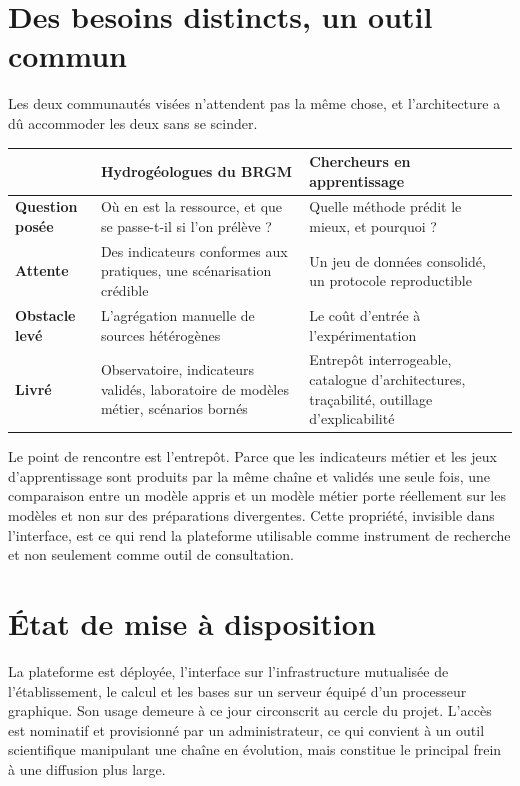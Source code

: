\section{Des besoins distincts, un outil commun}

Les deux communautés visées n'attendent pas la même chose, et l'architecture a dû accommoder les
deux sans se scinder.

\begin{center}
\begin{tabularx}{\textwidth}{@{}p{3.6cm}XX@{}}
\toprule
 & \textbf{Hydrogéologues du BRGM} & \textbf{Chercheurs en apprentissage} \\
\midrule
\textbf{Question posée} & Où en est la ressource, et que se passe-t-il si l'on prélève ? &
Quelle méthode prédit le mieux, et pourquoi ? \\
\textbf{Attente} & Des indicateurs conformes aux pratiques, une scénarisation crédible & Un jeu
de données consolidé, un protocole reproductible \\
\textbf{Obstacle levé} & L'agrégation manuelle de sources hétérogènes & Le coût d'entrée à
l'expérimentation \\
\textbf{Livré} & Observatoire, indicateurs validés, laboratoire de modèles métier, scénarios
bornés & Entrepôt interrogeable, catalogue d'architectures, traçabilité, outillage
d'explicabilité \\
\bottomrule
\end{tabularx}
\end{center}

Le point de rencontre est l'entrepôt. Parce que les indicateurs métier et les jeux
d'apprentissage sont produits par la même chaîne et validés une seule fois, une comparaison
entre un modèle appris et un modèle métier porte réellement sur les modèles et non sur des
préparations divergentes. Cette propriété, invisible dans l'interface, est ce qui rend la
plateforme utilisable comme instrument de recherche et non seulement comme outil de
consultation.

\section{État de mise à disposition}

La plateforme est déployée, l'interface sur l'infrastructure mutualisée de l'établissement, le
calcul et les bases sur un serveur équipé d'un processeur graphique. Son usage demeure à ce jour
circonscrit au cercle du projet. L'accès est nominatif et provisionné par un administrateur, ce
qui convient à un outil scientifique manipulant une chaîne en évolution, mais constitue le
principal frein à une diffusion plus large.

